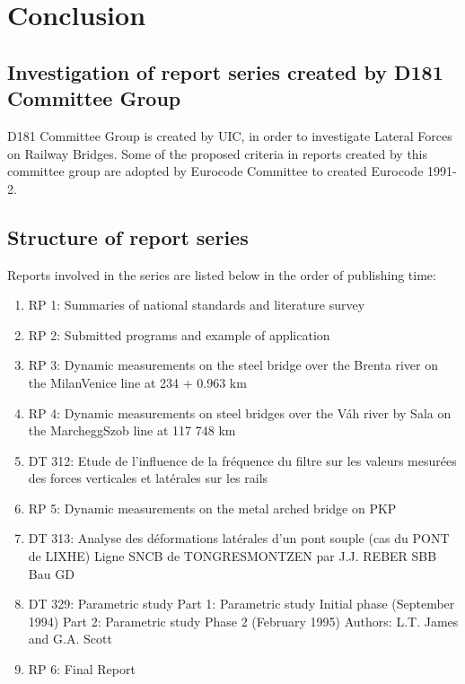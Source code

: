 



\chapter{Conclusion}


\begin{appendices}

\chapter{Investigation of report series created by D181 Committee Group}

D181 Committee Group is created by UIC, in order to investigate Lateral Forces on Railway Bridges. Some of the proposed criteria in reports created by this committee group are adopted by Eurocode Committee to created Eurocode 1991-2.

\section{Structure of report series}

Reports involved in the series are listed below in the order of publishing time:

\begin{enumerate}
    \item RP 1: Summaries of national standards and literature survey
    \item RP 2: Submitted programs and example of application
    \item RP 3: Dynamic measurements on the steel bridge over the Brenta river on the MilanVenice line at 234 + 0.963 km
    \item RP 4: Dynamic measurements on steel bridges over the Váh river by Sala on the MarcheggSzob line at 117 748 km
    \item DT 312: Etude de l'influence de la fréquence du filtre sur les valeurs mesurées des forces verticales et latérales sur les rails
    \item RP 5: Dynamic measurements on the metal arched bridge on PKP
    \item DT 313: Analyse des déformations latérales d'un pont souple (cas du PONT de LIXHE) Ligne SNCB de TONGRESMONTZEN par J.J. REBER SBB Bau GD
    \item DT 329: Parametric study Part 1: Parametric study Initial phase (September 1994) Part 2: Parametric study Phase 2 (February 1995) Authors: L.T. James and G.A. Scott
    \item RP 6: Final Report
\end{enumerate}


\end{appendices}

